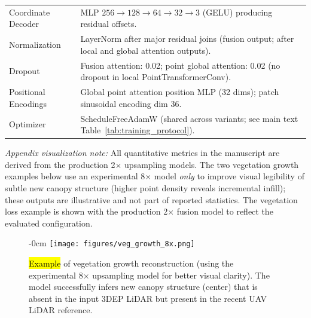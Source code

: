 \documentclass[remotesensing,article,accept,pdftex,moreauthors]{Definitions/mdpi}
\begin{document}
\begin{table}[H]
\begin{tabular}{p{3.2cm} p{10.8cm}}
    \addlinespace
    Coordinate Decoder & MLP $256\rightarrow128\rightarrow64\rightarrow32\rightarrow3$ (GELU) producing residual offsets. \\
    \addlinespace
    Normalization & LayerNorm after major residual joins (fusion output; after local and global attention outputs). \\
    \addlinespace
    Dropout & Fusion attention: 0.02; point global attention: 0.02 (no dropout in local PointTransformerConv). \\
    \addlinespace
    Positional Encodings & Global point attention position MLP (32 dims); patch sinusoidal encoding dim 36. \\
    \addlinespace
    Optimizer & ScheduleFreeAdamW (shared across variants; see main text Table~\ref{tab:training_protocol}). \\
    \bottomrule
  \end{tabular}
\end{table}

\noindent\textit{Appendix visualization note:} All quantitative metrics in the manuscript are derived from the production 2$\times$ upsampling models. The two vegetation growth examples below use an experimental 8$\times$ model \emph{only} to improve visual legibility of subtle new canopy structure (higher point density reveals incremental infill); these outputs are illustrative and not part of reported statistics. The vegetation loss example is shown with the production 2$\times$ fusion model to reflect the evaluated configuration.

\vspace{-12pt}
\begin{figure}[H]
\begin{adjustwidth}{-\extralength}{0cm}
    \centering
    \texttt{[image: figures/veg\_growth\_8x.png]}
    \end{adjustwidth}
    \caption{\hl{Example} %
 of vegetation growth reconstruction (using the experimental 8$\times$ upsampling model for better visual clarity). The model successfully infers new canopy structure (center) that is absent in the input 3DEP LiDAR but present in the recent UAV LiDAR reference.}
    \label{fig:appendix_growth1}
\end{figure}
\end{document}

